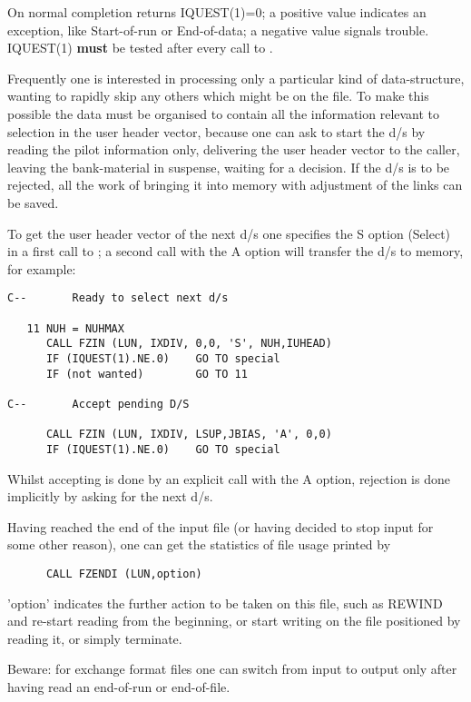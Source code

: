On normal completion  returns IQUEST(1)=0;
a positive value indicates an exception,
like Start-of-run or End-of-data;
a negative value signals trouble.
IQUEST(1) \textbf{must} be tested after every call to .

Frequently one is interested in processing only a particular
kind of data-structure, wanting to rapidly skip any others
which might be on the file.
To make this possible the data must be organised to contain
all the information relevant to selection in the user header vector,
because one can ask  to start the d/s by reading
the pilot information only, delivering the user header vector to
the caller, leaving the bank-material in suspense,
waiting for a decision.
If the d/s is to be rejected, all the work of bringing
it into memory with adjustment of the links can be saved.

To get the user header vector of the next d/s one specifies
the S option (Select) in a first call to ;
a second call with the A option will transfer the d/s to memory,
for example:
\begin{verbatim}
C--       Ready to select next d/s

   11 NUH = NUHMAX
      CALL FZIN (LUN, IXDIV, 0,0, 'S', NUH,IUHEAD)
      IF (IQUEST(1).NE.0)    GO TO special
      IF (not wanted)        GO TO 11

C--       Accept pending D/S

      CALL FZIN (LUN, IXDIV, LSUP,JBIAS, 'A', 0,0)
      IF (IQUEST(1).NE.0)    GO TO special
\end{verbatim}
Whilst accepting is done by an explicit call with the A option,
rejection is done implicitly by asking for the next d/s.

Having reached the end of the input file (or having decided
to stop input for some other reason),
one can get the statistics of file usage printed by
\begin{verbatim}
      CALL FZENDI (LUN,option)
\end{verbatim}
'option' indicates the further action to be taken on this file,
such as REWIND and re-start reading from the beginning,
or start writing on the file positioned by reading it,
or simply terminate.

Beware: for exchange format files one can switch from input
to output only after having read an end-of-run or end-of-file.

